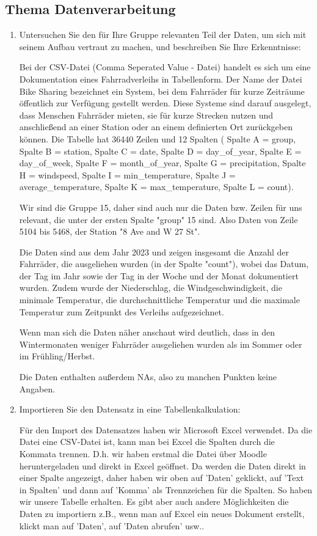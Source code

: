 \documentclass{article}
\begin{document}
\subsection{Thema Datenverarbeitung}
\begin{enumerate}
\item Untersuchen Sie den für Ihre Gruppe relevanten Teil der Daten, um sich mit seinem Aufbau vertraut zu machen, und beschreiben Sie Ihre Erkenntnisse:

Bei der CSV-Datei (Comma Seperated Value - Datei) handelt es sich um eine Dokumentation eines Fahrradverleihs in Tabellenform. Der Name der Datei Bike Sharing bezeichnet ein System, bei dem Fahrräder für kurze Zeiträume öffentlich zur Verfügung gestellt werden. Diese Systeme sind darauf ausgelegt, dass Menschen Fahrräder mieten, sie für kurze Strecken nutzen und anschließend an einer Station oder an einem definierten Ort zurückgeben können.
Die Tabelle hat 36440 Zeilen und 12 Spalten ( Spalte A = group, Spalte B = station, Spalte C = date, Spalte D = day\_of\_year, Spalte E = day\_of\_week, Spalte F = month\_of\_year, Spalte G = precipitation, Spalte H = windspeed, Spalte I = min\_temperature, Spalte J = average\_temperature, Spalte K = max\_temperature, Spalte L = count).
    
Wir sind die Gruppe 15, daher sind auch nur die Daten bzw. Zeilen für uns relevant, die unter der ersten Spalte "group" 15 sind. Also Daten von Zeile 5104 bis 5468, der Station  "8 Ave and W 27 St".

Die Daten sind aus dem Jahr 2023 und zeigen insgesamt die Anzahl der Fahrräder, die ausgeliehen wurden (in der Spalte "count"), wobei das Datum, der Tag im Jahr sowie der Tag in der Woche und der Monat dokumentiert wurden. Zudem wurde der Niederschlag, die Windgeschwindigkeit, die minimale Temperatur, die durchschnittliche Temperatur und die maximale Temperatur zum Zeitpunkt des Verleihs aufgezeichnet.
    
Wenn man sich die Daten näher anschaut wird deutlich, dass in den Wintermonaten weniger Fahrräder ausgeliehen wurden als im Sommer oder im Frühling/Herbst.
    
Die Daten enthalten außerdem NAs, also zu manchen Punkten keine Angaben.
    
\item Importieren Sie den Datensatz in eine Tabellenkalkulation: 
    
Für den Import des Datensatzes haben wir Microsoft Excel verwendet. Da die Datei eine CSV-Datei ist, kann man bei Excel die Spalten durch die Kommata trennen. D.h. wir haben erstmal die Datei über Moodle heruntergeladen und direkt in Excel geöffnet. Da werden die Daten direkt in einer Spalte angezeigt, daher haben wir oben auf 'Daten' geklickt, auf 'Text in Spalten' und dann auf 'Komma' als Trennzeichen für die Spalten. So haben wir unsere Tabelle erhalten. Es gibt aber auch andere Möglichkeiten die Daten zu importiern z.B., wenn man auf Excel ein neues Dokument erstellt, klickt man auf 'Daten', auf 'Daten abrufen' usw..


\end{enumerate}
\end{document}
